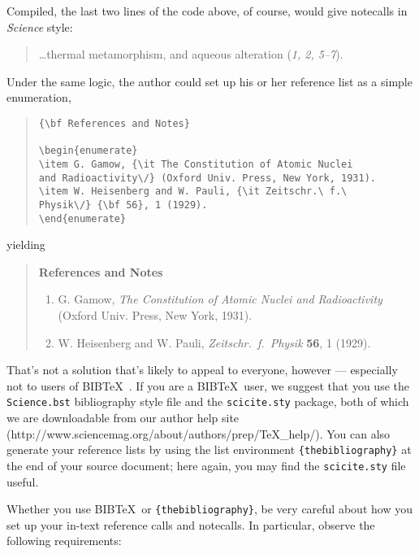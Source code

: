 \documentclass[letterpaper, 12pt]{article}
\begin{document}
{\noindent Compiled, the last two lines of the code above, of course, would give notecalls in {\it Science\/} style:

\begin{quote}
\ldots thermal metamorphism, and aqueous alteration ({\it 1, 2, 5--7\/}).
\end{quote}

Under the same logic, the author could set up his or her reference list as a simple enumeration,

\begin{quote}
\begin{verbatim}
{\bf References and Notes}

\begin{enumerate}
\item G. Gamow, {\it The Constitution of Atomic Nuclei
and Radioactivity\/} (Oxford Univ. Press, New York, 1931).
\item W. Heisenberg and W. Pauli, {\it Zeitschr.\ f.\ 
Physik\/} {\bf 56}, 1 (1929).
\end{enumerate}
\end{verbatim}
\end{quote}

\noindent yielding

\begin{quote}
{\bf References and Notes}

\begin{enumerate}
\item G. Gamow, {\it The Constitution of Atomic Nuclei and
Radioactivity\/} (Oxford Univ. Press, New York, 1931).
\item W. Heisenberg and W. Pauli, {\it Zeitschr.\ f.\ Physik} {\bf 56},
1 (1929).
\end{enumerate}
\end{quote}

That's not a solution that's likely to appeal to everyone, however ---
especially not to users of B{\small{IB}}\TeX\ \cite{inclme}.  If you
are a B{\small{IB}}\TeX\ user, we suggest that you use the
\texttt{Science.bst} bibliography style file and the
\texttt{scicite.sty} package, both of which we are downloadable from our author help site
(http://www.sciencemag.org/about/authors/prep/TeX\_help/).  You can also
generate your reference lists by using the list environment
\texttt{\{thebibliography\}} at the end of your source document; here
again, you may find the \texttt{scicite.sty} file useful.

Whether you use B{\small{IB}}\TeX\ or \texttt{\{thebibliography\}}, be
very careful about how you set up your in-text reference calls and
notecalls.  In particular, observe the following requirements:

}
\end{document}
